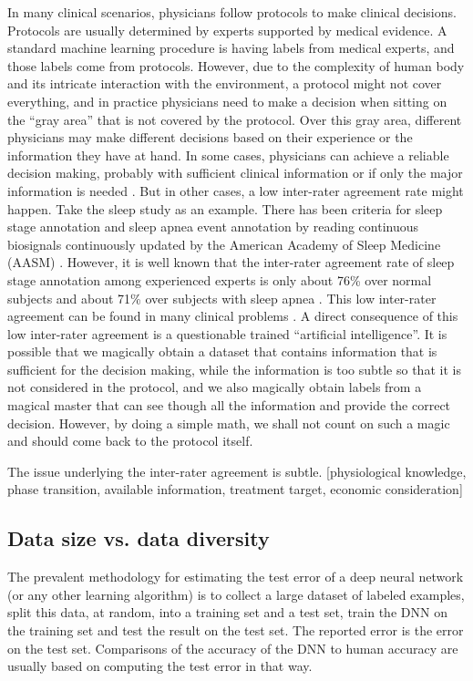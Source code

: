 \documentclass[fleqn,10pt]{wlscirep}
\begin{document}
{\color{blue}

In many clinical scenarios, physicians follow protocols to make clinical decisions. Protocols are usually determined by experts supported by medical evidence. 
%
A standard machine learning procedure is having labels from medical experts, and those labels come from protocols. However, due to the complexity of human body and its intricate interaction with the environment, a protocol might not cover everything, and in practice physicians need to make a decision when sitting on the ``gray area'' that is not covered by the protocol. Over this gray area, different physicians may make different decisions based on their experience or the information they have at hand. In some cases, physicians can achieve a reliable decision making, probably with sufficient clinical information \cite{mehta2011agreement} or if only the major information is needed \cite{atiya2003interobserver}. But in other cases, a low inter-rater agreement rate might happen. Take the sleep study as an example. There has been criteria for sleep stage annotation and sleep apnea event annotation by reading continuous biosignals continuously updated by the American Academy of Sleep Medicine (AASM) \cite{Iber2007,berry2012aasm}. However, it is well known that the inter-rater agreement rate of sleep stage annotation among experienced experts is only about 76\% over normal subjects and about 71\% over subjects with sleep apnea \cite{norman2000interobserver}. This low inter-rater agreement can be found in many clinical problems \cite{brosnan2015modest,venhola2003interobserver,moncada2011reading}. A direct consequence of this low inter-rater agreement is a questionable trained ``artificial intelligence''. It is possible that we magically obtain a dataset that contains information that is sufficient for the decision making, while the information is too subtle so that it is not considered in the protocol, and we also magically obtain labels from a magical master that can see though all the information and provide the correct decision. However, by doing a simple math, we shall not count on such a magic and should come back to the protocol itself.

The issue underlying the inter-rater agreement is subtle. [physiological knowledge, phase transition, available information, treatment target, economic consideration]

}




\subsection*{Data size vs. data diversity}
The prevalent methodology for estimating the test error of a deep neural network (or any other learning algorithm) is to 
collect a large dataset of labeled examples, split this data, at random, into a training set and a test set, train the DNN on the training set and test the result on the test set. The reported error is the error on the test set. Comparisons of the accuracy of the DNN to human accuracy are usually based on computing the test error in that way.
\end{document}
